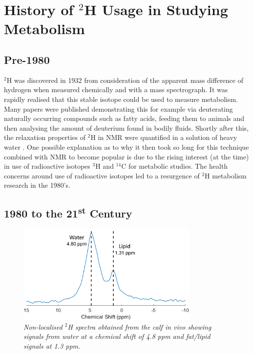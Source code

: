\section{History of \texorpdfstring{$^2$H}{2H} Usage in Studying Metabolism}

\subsection{Pre-1980}

$^2$H was discovered in 1932 \cite{Urey1932AConcentration} from consideration of the apparent mass difference of hydrogen when measured chemically and with a mass spectrograph. It was rapidly realised that this stable isotope could be used to measure metabolism. Many papers were published demonstrating this \cite{Schoenheimer1935DeuteriumMetabolism,Schoenheimer1938TheMetabolism} for example via deuterating naturally occurring compounds such as fatty acids, feeding them to animals and then analysing the amount of deuterium found in bodily fluids. Shortly after this, the relaxation properties of $^2$H in \ac{NMR} were quantified in a solution of heavy water \cite{Bloembergen1948RelaxationAbsorption}. One possible explanation as to why it then took so long for this technique combined with \ac{NMR} to become popular is due to the rising interest (at the time) \cite{DeFeyter2021DeuteriumFuture} in use of radioactive isotopes $^3$H \cite{Thompson1953StudiesRat} and $^{14}$C \cite{Turteltaub1990AcceleratorDNA.} for metabolic studies. The health concerns around use of radioactive isotopes led to a resurgence of $^2$H metabolism research in the 1980's.

\subsection{1980 to the \texorpdfstring{21\textsuperscript{st}}{21st} Century}


\begin{figure}
    \centering
    \includegraphics[width=0.8\textwidth]{Figures/Intro/NA_Spectra.png}
    \caption{\textit{Non-localised $^2$H spectra obtained from the calf \textit{in vivo} showing signals from water at a chemical shift of 4.8 ppm and fat/lipid signals at 1.3 ppm.}}
    \label{fig:intro:NA}
\end{figure}

